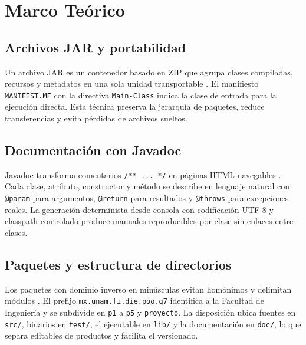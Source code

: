 \documentclass[letterpaper,12pt,oneside]{article}
\numberwithin{figure}{section}
\begin{document}
\section{Marco Te\'orico}

\subsection{Archivos JAR y portabilidad}
Un archivo JAR es un contenedor basado en ZIP que agrupa clases compiladas, recursos y metadatos en una sola unidad transportable \cite{oracle}. El manifiesto \texttt{MANIFEST.MF} con la directiva \texttt{Main-Class} indica la clase de entrada para la ejecuci\'on directa. Esta t\'ecnica preserva la jerarqu\'ia de paquetes, reduce transferencias y evita p\'erdidas de archivos sueltos.

\subsection{Documentaci\'on con Javadoc}
Javadoc transforma comentarios \texttt{/** ... */} en p\'aginas HTML navegables \cite{joyanes}. Cada clase, atributo, constructor y m\'etodo se describe en lenguaje natural con \texttt{@param} para argumentos, \texttt{@return} para resultados y \texttt{@throws} para excepciones reales. La generaci\'on determinista desde consola con codificaci\'on UTF-8 y classpath controlado produce manuales reproducibles por clase sin enlaces entre clases.

\subsection{Paquetes y estructura de directorios}
Los paquetes con dominio inverso en min\'usculas evitan hom\'onimos y delimitan m\'odulos \cite{deitel}. El prefijo \texttt{mx.unam.fi.die.poo.g7} identifica a la Facultad de Ingenier\'ia y se subdivide en \texttt{p1} a \texttt{p5} y \texttt{proyecto}. La disposici\'on ubica fuentes en \texttt{src/}, binarios en \texttt{test/}, el ejecutable en \texttt{lib/} y la documentaci\'on en \texttt{doc/}, lo que separa editables de productos y facilita el versionado.
\end{document}
